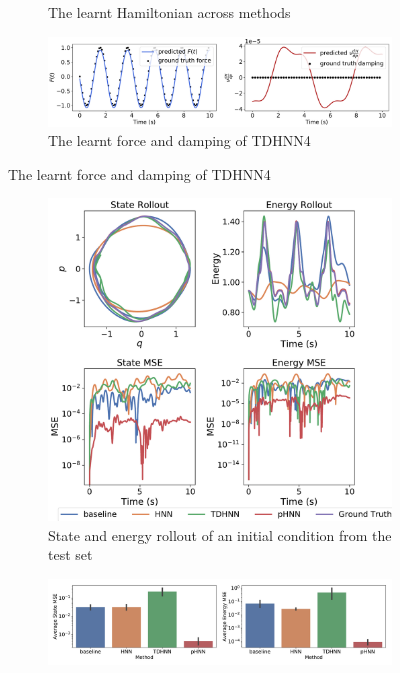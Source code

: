 \documentclass{article}
\begin{document}
\begin{figure}[!htb]
\begin{subfigure}[b]{0.48\textwidth}
\caption{The learnt Hamiltonian across methods}
\end{subfigure}
\begin{subfigure}[b]{0.48\textwidth}
\includegraphics[width=\textwidth]{figures/figures/forced_mass_spring/1/forced_mass_spring_dpdt_new_0.pdf}
\caption{The learnt force and damping of TDHNN4}
\end{subfigure}
\label{forced_mspring_1_full}
\end{figure}
\begin{figure}[!htb]
\centering
\captionsetup{justification=centering}
\begin{subfigure}[b]{0.48\textwidth}
\includegraphics[width=\textwidth]{figures/figures/forced_mass_spring/2/forced_mass_spring_long_0.pdf}
\caption{State and energy rollout of an initial condition from the test set}
\end{subfigure}
\begin{subfigure}[b]{0.48\textwidth}
\includegraphics[width=\textwidth]{figures/figures/forced_mass_spring/2/forced_mass_spring_errors_0.pdf}

\end{subfigure}
\end{figure}
\end{document}
